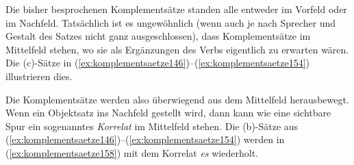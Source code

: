 \Stretch[0.25]

Die bisher besprochenen Komplementsätze standen alle entweder im Vorfeld oder im Nachfeld.
Tatsächlich ist es ungewöhnlich (wenn auch je nach Sprecher und Gestalt des Satzes nicht ganz ausgeschlossen), dass Komplementsätze im Mittelfeld stehen, wo sie als Ergänzungen des Verbs eigentlich zu erwarten wären.
Die (c)-Sätze in (\ref{ex:komplementsaetze146})--(\ref{ex:komplementsaetze154}) illustrieren dies.

\Stretch[0.25]

\begin{exe}
  \ex\label{ex:komplementsaetze146}
  \begin{xlist}
  \end{xlist}

  \ex\label{ex:komplementsaetze150}
  \begin{xlist}
  \end{xlist}
  \ex\label{ex:komplementsaetze154}
  \begin{xlist}
  \end{xlist}
\end{exe}

\Stretch[0.25]

Die Komplementsätze werden also überwiegend aus dem Mittelfeld herausbewegt.
Wenn ein Objektsatz ins Nachfeld gestellt wird, dann kann wie eine sichtbare Spur ein sogenanntes \textit{Korrelat} im Mittelfeld stehen.
Die (b)-Sätze aus (\ref{ex:komplementsaetze146})--(\ref{ex:komplementsaetze154}) werden in (\ref{ex:komplementsaetze158}) mit dem Korrelat \textit{es} wiederholt.

